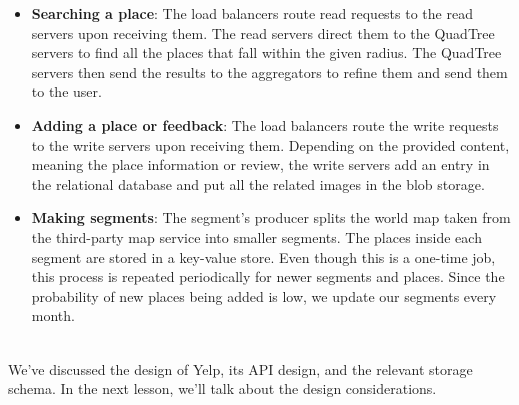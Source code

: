 \begin{itemize}
\item
\protect{}\label{zGrqtD52QJbiJqG-W8CmB}
\textbf{Searching a place}: The load balancers route read requests to the read servers upon receiving them. The read servers direct them to the QuadTree servers to find all the places that fall within the given radius. The QuadTree servers then send the results to the aggregators to refine them and send them to the user.
\item
\protect{}\label{pYHGnxk1fhJ_Na2IQ5NJK}
\textbf{Adding a place or feedback}: The load balancers route the write requests to the write servers upon receiving them. Depending on the provided content, meaning the place information or review, the write servers add an entry in the relational database and put all the related images in the blob storage.
\item
\protect{}\label{t8hsQzp0E9S3E4KT6uoOM}
\textbf{Making segments}: The segment's producer splits the world map taken from the third-party map service into smaller segments. The places inside each segment are stored in a key-value store. Even though this is a one-time job, this process is repeated periodically for newer segments and places. Since the probability of new places being added is low, we update our segments every month.
\end{itemize}
\\
We've discussed the design of Yelp, its API design, and the relevant storage schema. In the next lesson, we'll talk about the design considerations.

